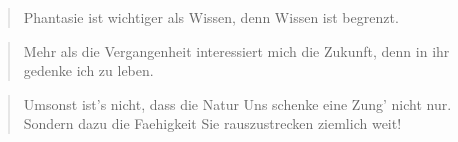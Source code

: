 \begin{quote}
    Phantasie ist wichtiger als Wissen, denn Wissen ist begrenzt.
\end{quote}
\begin{quotation}
    Mehr als die Vergangenheit interessiert mich die Zukunft, denn in ihr gedenke ich zu leben.\end{quotation}
\begin{verse}
    Umsonst ist's nicht, dass die Natur
    Uns schenke eine Zung' nicht nur.
    Sondern dazu die Faehigkeit
    Sie rauszustrecken ziemlich weit!
\end{verse}
